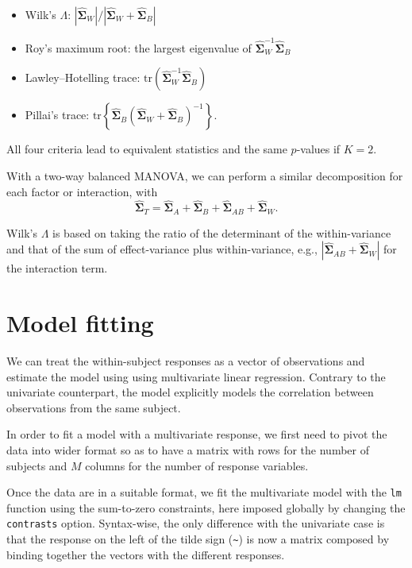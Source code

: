 \documentclass[
  11pt,
  letterpaper,
]{scrbook}
\providecommand{\tightlist}{%
  \setlength{\itemsep}{0pt}\setlength{\parskip}{0pt}}\usepackage{longtable,booktabs,array}
\theoremstyle{definition}
\theoremstyle{definition}
\theoremstyle{remark}
\begin{document}
\begin{itemize}
\tightlist
\item
  Wilk's \(\Lambda\):
  \(|\widehat{\boldsymbol{\Sigma}}_W|/|\widehat{\boldsymbol{\Sigma}}_W + \widehat{\boldsymbol{\Sigma}}_B|\)
\item
  Roy's maximum root: the largest eigenvalue of
  \(\widehat{\boldsymbol{\Sigma}}_W^{-1}\widehat{\boldsymbol{\Sigma}}_B\)
\item
  Lawley--Hotelling trace:
  \(\mathrm{tr}(\widehat{\boldsymbol{\Sigma}}_W^{-1}\widehat{\boldsymbol{\Sigma}}_B)\)
\item
  Pillai's trace:
  \(\mathrm{tr}\left\{\widehat{\boldsymbol{\Sigma}}_B(\widehat{\boldsymbol{\Sigma}}_W +\widehat{\boldsymbol{\Sigma}}_B)^{-1}\right\}\).
\end{itemize}

All four criteria lead to equivalent statistics and the same
\(p\)-values if \(K=2\).

With a two-way balanced MANOVA, we can perform a similar decomposition
for each factor or interaction, with
\[\widehat{\boldsymbol{\Sigma}}_T = \widehat{\boldsymbol{\Sigma}}_A + \widehat{\boldsymbol{\Sigma}}_B + \widehat{\boldsymbol{\Sigma}}_{AB} + \widehat{\boldsymbol{\Sigma}}_W.\]

Wilk's \(\Lambda\) is based on taking the ratio of the determinant of
the within-variance and that of the sum of effect-variance plus
within-variance, e.g.,
\(|\widehat{\boldsymbol{\Sigma}}_{AB} + \widehat{\boldsymbol{\Sigma}}_W|\)
for the interaction term.

\section{Model fitting}\label{model-fitting}

We can treat the within-subject responses as a vector of observations
and estimate the model using using multivariate linear regression.
Contrary to the univariate counterpart, the model explicitly models the
correlation between observations from the same subject.

In order to fit a model with a multivariate response, we first need to
pivot the data into wider format so as to have a matrix with rows for
the number of subjects and \(M\) columns for the number of response
variables.

Once the data are in a suitable format, we fit the multivariate model
with the \texttt{lm} function using the sum-to-zero constraints, here
imposed globally by changing the \texttt{contrasts} option. Syntax-wise,
the only difference with the univariate case is that the response on the
left of the tilde sign (\texttt{\textasciitilde{}}) is now a matrix
composed by binding together the vectors with the different responses.
\end{document}
